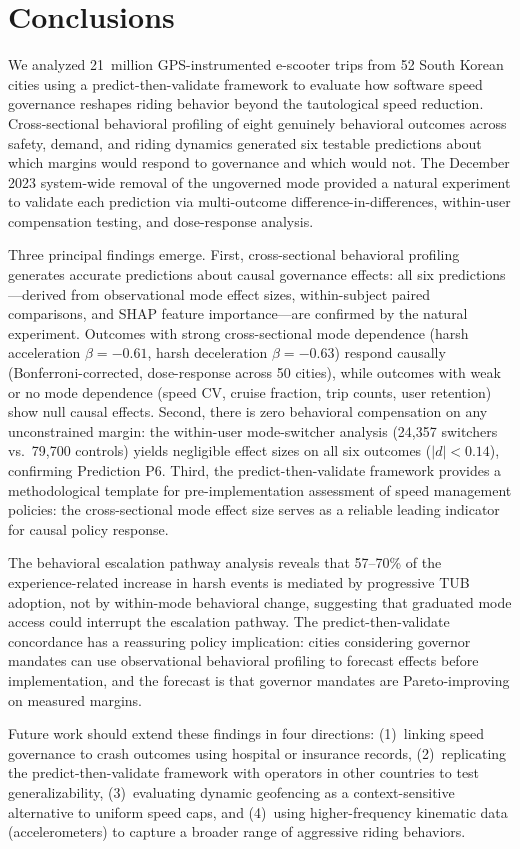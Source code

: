 \section{Conclusions}
\label{sec:conclusion}

We analyzed 21~million GPS-instrumented e-scooter trips from 52 South Korean cities using a predict-then-validate framework to evaluate how software speed governance reshapes riding behavior beyond the tautological speed reduction. Cross-sectional behavioral profiling of eight genuinely behavioral outcomes across safety, demand, and riding dynamics generated six testable predictions about which margins would respond to governance and which would not. The December 2023 system-wide removal of the ungoverned mode provided a natural experiment to validate each prediction via multi-outcome difference-in-differences, within-user compensation testing, and dose-response analysis.

Three principal findings emerge. First, cross-sectional behavioral profiling generates accurate predictions about causal governance effects: all six predictions---derived from observational mode effect sizes, within-subject paired comparisons, and SHAP feature importance---are confirmed by the natural experiment. Outcomes with strong cross-sectional mode dependence (harsh acceleration $\beta = -0.61$, harsh deceleration $\beta = -0.63$) respond causally (Bonferroni-corrected, dose-response across 50 cities), while outcomes with weak or no mode dependence (speed CV, cruise fraction, trip counts, user retention) show null causal effects. Second, there is zero behavioral compensation on any unconstrained margin: the within-user mode-switcher analysis (24,357 switchers vs.\ 79,700 controls) yields negligible effect sizes on all six outcomes ($|d| < 0.14$), confirming Prediction P6. Third, the predict-then-validate framework provides a methodological template for pre-implementation assessment of speed management policies: the cross-sectional mode effect size serves as a reliable leading indicator for causal policy response.

The behavioral escalation pathway analysis reveals that 57--70\% of the experience-related increase in harsh events is mediated by progressive TUB adoption, not by within-mode behavioral change, suggesting that graduated mode access could interrupt the escalation pathway. The predict-then-validate concordance has a reassuring policy implication: cities considering governor mandates can use observational behavioral profiling to forecast effects before implementation, and the forecast is that governor mandates are Pareto-improving on measured margins.

Future work should extend these findings in four directions: (1)~linking speed governance to crash outcomes using hospital or insurance records, (2)~replicating the predict-then-validate framework with operators in other countries to test generalizability, (3)~evaluating dynamic geofencing as a context-sensitive alternative to uniform speed caps, and (4)~using higher-frequency kinematic data (accelerometers) to capture a broader range of aggressive riding behaviors.
